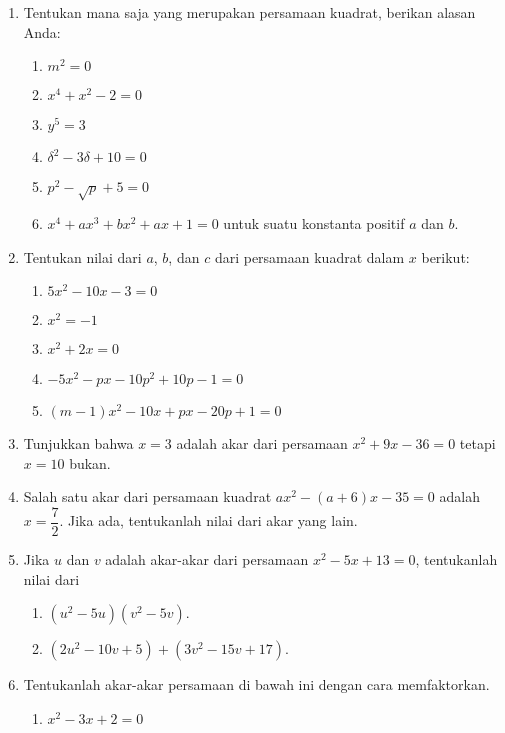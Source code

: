 		\begin{enumerate}[nosep]
			\item Tentukan mana saja yang merupakan persamaan kuadrat, berikan alasan Anda:
			\begin{enumerate}
				\item $ m^{2} = 0 $
				\item $ x^{4} + x^{2} - 2 = 0 $
				\item $ y^{5} = 3 $
				\item $ \delta^{2} - 3\delta + 10 = 0 $
				\item $ p^{2} - \sqrt{p} + 5 = 0 $
				\item $ x^{4} + ax^{3} + bx^{2} + ax + 1 = 0 $ untuk suatu konstanta positif $ a $ dan $ b $.
			\end{enumerate}
			\item Tentukan nilai dari $ a $, $ b $, dan $ c $ dari persamaan kuadrat dalam $ x $ berikut:
			\begin{enumerate}
				\item $ 5x^{2} - 10x - 3 = 0 $
				\item $ x^{2} = -1 $
				\item $ x^{2} + 2x = 0 $
				\item $ -5x^{2} - px - 10p^{2} + 10p - 1 = 0 $
				\item $ \left(m - 1\right)x^{2} - 10x + px - 20p + 1 = 0 $
			\end{enumerate}
			\item Tunjukkan bahwa $ x = 3 $ adalah akar dari persamaan $ x^{2} + 9x - 36 = 0 $ tetapi $ x = 10 $ bukan.
			\item Salah satu akar dari persamaan kuadrat $ ax^{2} - \left(a + 6\right)x - 35 = 0 $ adalah $ x = \dfrac{7}{2} $. Jika ada, tentukanlah nilai dari akar yang lain.
			\item Jika $ u $ dan $ v $ adalah akar-akar dari persamaan $ x^{2} - 5x + 13 = 0 $, tentukanlah nilai dari
			\begin{enumerate}
				\item $ \left(u^{2} - 5u\right)\left(v^{2} - 5v\right) $.
				\item $ \left(2u^{2} - 10v + 5\right) + \left(3v^{2} - 15v + 17\right) $.
			\end{enumerate}
			\item Tentukanlah akar-akar persamaan di bawah ini dengan cara memfaktorkan.
			\begin{multcols}
				\begin{enumerate}
					\item $ x^{2} - 3x + 2 = 0 $

\end{enumerate}
\end{multcols}
\end{enumerate}
